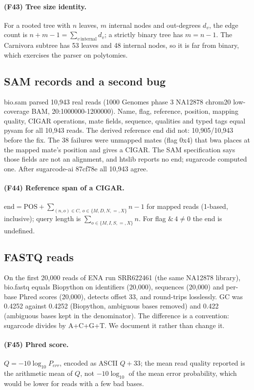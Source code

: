 \paragraph{(F43) Tree size identity.} For a rooted tree with $n$ leaves, $m$ internal nodes and out-degrees $d_v$, the edge count is $n+m-1=\sum_{v\,\mathrm{internal}}d_v$; a strictly binary tree has $m=n-1$. The Carnivora subtree has 53 leaves and 48 internal nodes, so it is far from binary, which exercises the parser on polytomies.
\subsection{SAM records and a second bug}
bio.sam parsed 10,943 real reads (1000 Genomes phase 3 NA12878 chrom20 low-coverage BAM, 20:1000000-1200000). Name, flag, reference, position, mapping quality, CIGAR operations, mate fields, sequence, qualities and typed tags equal pysam for all 10,943 reads. The derived reference end did not: 10,905/10,943 before the fix. The 38 failures were unmapped mates (flag 0x4) that bwa places at the mapped mate's position and gives a CIGAR. The SAM specification says those fields are not an alignment, and htslib reports no end; sugarcode computed one. After sugarcode-ai 87cf78e all 10,943 agree.
\paragraph{(F44) Reference span of a CIGAR.} $\mathrm{end}=\mathrm{POS}+\sum_{(n,o)\in C,\ o\in\{M,D,N,=,X\}}n-1$ for mapped reads (1-based, inclusive); query length is $\sum_{o\in\{M,I,S,=,X\}}n$. For flag $\&\,4\ne0$ the end is undefined.
\subsection{FASTQ reads}
On the first 20,000 reads of ENA run SRR622461 (the same NA12878 library), bio.fastq equals Biopython on identifiers (20,000), sequences (20,000) and per-base Phred scores (20,000), detects offset 33, and round-trips losslessly. GC was 0.4252 against 0.4252 (Biopython, ambiguous bases removed) and 0.422 (ambiguous bases kept in the denominator). The difference is a convention: sugarcode divides by A+C+G+T. We document it rather than change it.
\paragraph{(F45) Phred score.} $Q=-10\log_{10}P_{err}$, encoded as ASCII $Q+33$; the mean read quality reported is the arithmetic mean of $Q$, not $-10\log_{10}$ of the mean error probability, which would be lower for reads with a few bad bases.
